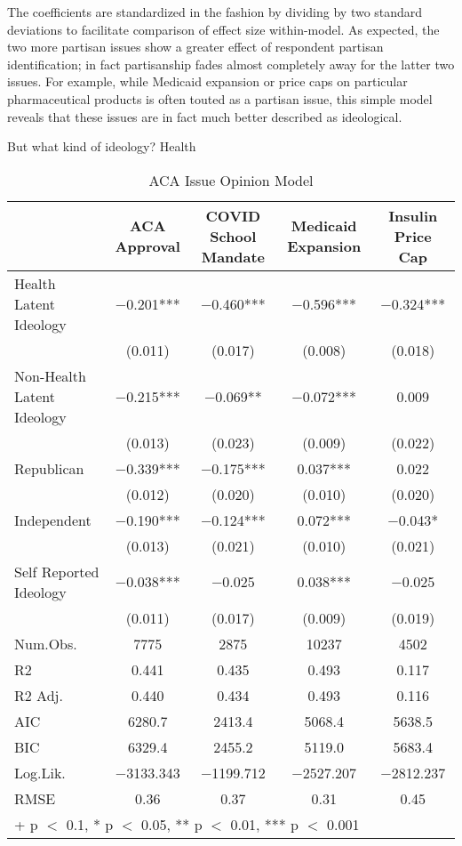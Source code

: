 \documentclass[
  oneside]{book}
\begin{document}
The coefficients are standardized in the \citet{Gelman:2008} fashion by dividing by two standard deviations to facilitate comparison of effect size within-model. As expected, the two more partisan issues show a greater effect of respondent partisan identification; in fact partisanship fades almost completely away for the latter two issues. For example, while Medicaid expansion or price caps on particular pharmaceutical products is often touted as a partisan issue, this simple model reveals that these issues are in fact much better described as ideological.

But what kind of ideology? Health

\begin{table}

\caption{\label{tab:acaopinion-model}ACA Issue Opinion Model}
\centering
\begin{tabular}[t]{lcccc}
\toprule
  & ACA Approval & COVID School Mandate & Medicaid Expansion & Insulin Price Cap\\
\midrule
Health Latent Ideology & \num{-0.201}*** & \num{-0.460}*** & \num{-0.596}*** & \num{-0.324}***\\
 & (\num{0.011}) & (\num{0.017}) & (\num{0.008}) & (\num{0.018})\\
Non-Health Latent Ideology & \num{-0.215}*** & \num{-0.069}** & \num{-0.072}*** & \num{0.009}\\
 & (\num{0.013}) & (\num{0.023}) & (\num{0.009}) & (\num{0.022})\\
Republican & \num{-0.339}*** & \num{-0.175}*** & \num{0.037}*** & \num{0.022}\\
 & (\num{0.012}) & (\num{0.020}) & (\num{0.010}) & (\num{0.020})\\
Independent & \num{-0.190}*** & \num{-0.124}*** & \num{0.072}*** & \num{-0.043}*\\
 & (\num{0.013}) & (\num{0.021}) & (\num{0.010}) & (\num{0.021})\\
Self Reported Ideology & \num{-0.038}*** & \num{-0.025} & \num{0.038}*** & \num{-0.025}\\
 & (\num{0.011}) & (\num{0.017}) & (\num{0.009}) & (\num{0.019})\\
\midrule
Num.Obs. & \num{7775} & \num{2875} & \num{10237} & \num{4502}\\
R2 & \num{0.441} & \num{0.435} & \num{0.493} & \num{0.117}\\
R2 Adj. & \num{0.440} & \num{0.434} & \num{0.493} & \num{0.116}\\
AIC & \num{6280.7} & \num{2413.4} & \num{5068.4} & \num{5638.5}\\
BIC & \num{6329.4} & \num{2455.2} & \num{5119.0} & \num{5683.4}\\
Log.Lik. & \num{-3133.343} & \num{-1199.712} & \num{-2527.207} & \num{-2812.237}\\
RMSE & \num{0.36} & \num{0.37} & \num{0.31} & \num{0.45}\\
\bottomrule
\multicolumn{5}{l}{\rule{0pt}{1em}+ p $<$ 0.1, * p $<$ 0.05, ** p $<$ 0.01, *** p $<$ 0.001}\\
\end{tabular}
\end{table}
\end{document}
